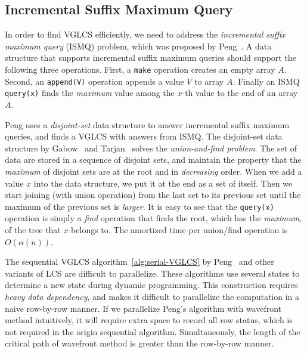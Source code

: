 



\subsection{Incremental Suffix Maximum Query}

In order to find VGLCS efficiently, we need to address the {\em
incremental suffix maximum query} (ISMQ) problem, which was proposed by
Peng~\cite{Peng2011TheLC}.  A data structure that supports incremental
suffix maximum queries should support the following three operations.
First, a {\tt make} operation creates an empty array $A$. Second, an
{\tt append(V)} operation appends a value $V$ to array $A$. Finally an
ISMQ {\tt query(x)} finds the {\em maximum} value among the $x$-th value
to the end of an array $A$.


Peng uses a {\em disjoint-set} data structure to answer incremental
suffix maximum queries, and finds a VGLCS with answers from ISMQ. The
disjoint-set data structure by Gabow~\cite{Gabow1983ALA} and
Tarjan~\cite{Tarjan1975EfficiencyOA} solves the {\em union-and-find
  problem}.  The set of data are stored in a sequence of disjoint
sets, and maintain the property that the {\em maximum} of disjoint
sets are at the root and in {\em decreasing} order.  When we add a
value $x$ into the data structure, we put it at the end as a set of
itself.  Then we start joining (with union operation) from the last
set to its previous set until the maximum of the previous set is {\em
  larger}.  It is easy to see that the {\tt query(x)} operation is
simply a {\em find} operation that finds the root, which has the {\em
  maximum}, of the tree that $x$ belongs to.  The amortized time per
union/find operation is $O(\alpha(n))$.


The sequential VGLCS algorithm~\ref{alg:serial-VGLCS} by
Peng~\cite{Peng2011TheLC} and other variants of LCS are difficult to
parallelize.  These algorithms use several states to determine a new
state during dynamic programming.  This construction requires {\em heavy
data dependency}, and makes it difficult to parallelize the computation
in a naive row-by-row manner.  If we parallelize Peng's algorithm with
wavefront method intuitively, it will require extra space to record all
row status, which is not required in the origin sequential algorithm.
Simultaneously, the length of the critical path of wavefront method is
greater than the row-by-row manner.


